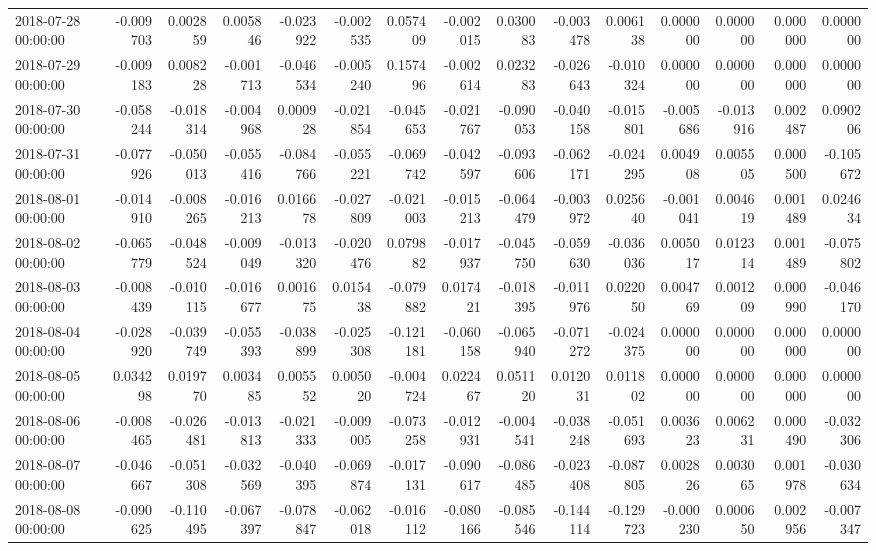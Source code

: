 \begin{tabular}{lrrrrrrrrrrrrrr}
2018-07-28 00:00:00 & -0.009703 & 0.002859 & 0.005846 & -0.023922 & -0.002535 & 0.057409 & -0.002015 & 0.030083 & -0.003478 & 0.006138 & 0.000000 & 0.000000 & 0.000000 & 0.000000 \\
2018-07-29 00:00:00 & -0.009183 & 0.008228 & -0.001713 & -0.046534 & -0.005240 & 0.157496 & -0.002614 & 0.023283 & -0.026643 & -0.010324 & 0.000000 & 0.000000 & 0.000000 & 0.000000 \\
2018-07-30 00:00:00 & -0.058244 & -0.018314 & -0.004968 & 0.000928 & -0.021854 & -0.045653 & -0.021767 & -0.090053 & -0.040158 & -0.015801 & -0.005686 & -0.013916 & 0.002487 & 0.090206 \\
2018-07-31 00:00:00 & -0.077926 & -0.050013 & -0.055416 & -0.084766 & -0.055221 & -0.069742 & -0.042597 & -0.093606 & -0.062171 & -0.024295 & 0.004908 & 0.005505 & 0.000500 & -0.105672 \\
2018-08-01 00:00:00 & -0.014910 & -0.008265 & -0.016213 & 0.016678 & -0.027809 & -0.021003 & -0.015213 & -0.064479 & -0.003972 & 0.025640 & -0.001041 & 0.004619 & 0.001489 & 0.024634 \\
2018-08-02 00:00:00 & -0.065779 & -0.048524 & -0.009049 & -0.013320 & -0.020476 & 0.079882 & -0.017937 & -0.045750 & -0.059630 & -0.036036 & 0.005017 & 0.012314 & 0.001489 & -0.075802 \\
2018-08-03 00:00:00 & -0.008439 & -0.010115 & -0.016677 & 0.001675 & 0.015438 & -0.079882 & 0.017421 & -0.018395 & -0.011976 & 0.022050 & 0.004769 & 0.001209 & 0.000990 & -0.046170 \\
2018-08-04 00:00:00 & -0.028920 & -0.039749 & -0.055393 & -0.038899 & -0.025308 & -0.121181 & -0.060158 & -0.065940 & -0.071272 & -0.024375 & 0.000000 & 0.000000 & 0.000000 & 0.000000 \\
2018-08-05 00:00:00 & 0.034298 & 0.019770 & 0.003485 & 0.005552 & 0.005020 & -0.004724 & 0.022467 & 0.051120 & 0.012031 & 0.011802 & 0.000000 & 0.000000 & 0.000000 & 0.000000 \\
2018-08-06 00:00:00 & -0.008465 & -0.026481 & -0.013813 & -0.021333 & -0.009005 & -0.073258 & -0.012931 & -0.004541 & -0.038248 & -0.051693 & 0.003623 & 0.006231 & 0.000490 & -0.032306 \\
2018-08-07 00:00:00 & -0.046667 & -0.051308 & -0.032569 & -0.040395 & -0.069874 & -0.017131 & -0.090617 & -0.086485 & -0.023408 & -0.087805 & 0.002826 & 0.003065 & 0.001978 & -0.030634 \\
2018-08-08 00:00:00 & -0.090625 & -0.110495 & -0.067397 & -0.078847 & -0.062018 & -0.016112 & -0.080166 & -0.085546 & -0.144114 & -0.129723 & -0.000230 & 0.000650 & 0.002956 & -0.007347 \\

\end{tabular}
